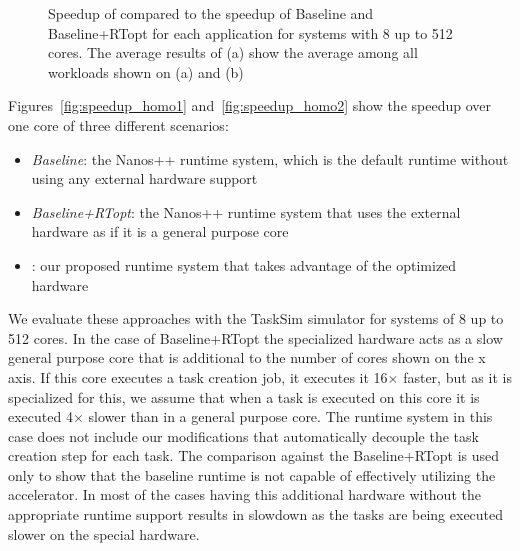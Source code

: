 \begin{figure}[t]%
	\centering
	
	\caption{Speedup of {\proposal} compared to the speedup of Baseline and Baseline+RTopt for each application for systems with 8 up to 512 cores. The average results of (a) show the average among all workloads shown on (a) and (b)}
\end{figure}

Figures~\ref{fig:speedup_homo1} and~\ref{fig:speedup_homo2} show the speedup over one core of three different scenarios: 
\begin{itemize}
	\item \textit{Baseline}: the Nanos++ runtime system, which is the default runtime without using any external hardware support
	\item \textit{Baseline+RTopt}: the Nanos++ runtime system that uses the external hardware as if it is a general purpose core 
	\item \textit{{\proposal}}: our proposed runtime system that takes advantage of the optimized hardware
\end{itemize}
We evaluate these approaches with the TaskSim simulator for systems of 8 up to 512 cores.
In the case of Baseline+RTopt the specialized hardware acts as a slow general purpose core that is additional to the number of cores shown on the x axis.
If this core executes a task creation job, it executes it 16$\times$ faster, but as it is specialized for this, we assume that when a task is executed on this core it is executed 4$\times$ slower than in a general purpose core.
The runtime system in this case does not include our modifications that automatically decouple the task creation step for each task.
The comparison against the Baseline+RTopt is used only to show that the baseline runtime is not capable of effectively utilizing the accelerator. 
In most of the cases having this additional hardware without the appropriate runtime support results in slowdown as the tasks are being executed slower on the special hardware.

